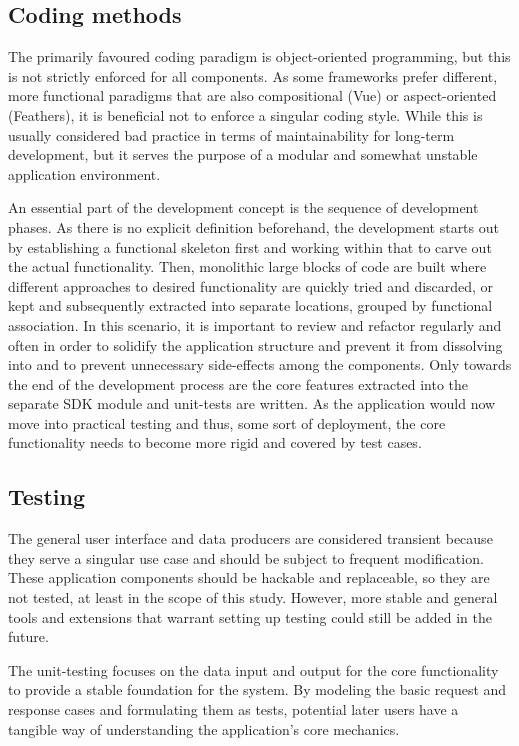 \subsection{Coding methods}

The primarily favoured coding paradigm is object-oriented programming, but this is not strictly enforced for all components.
As some frameworks prefer different, more functional paradigms that are also compositional (Vue) or aspect-oriented (Feathers), it is beneficial not to enforce a singular coding style.
While this is usually considered bad practice in terms of maintainability for long-term development, but it serves the purpose of a modular and somewhat unstable  application environment.

An essential part of the development concept is the sequence of development phases.
As there is no explicit definition beforehand, the development starts out by establishing a functional skeleton first and working within that to carve out the actual functionality.
Then, monolithic large blocks of code are built where different approaches to desired functionality are quickly tried and discarded, or kept and subsequently extracted into separate locations, grouped by functional association.
In this scenario, it is important to review and refactor regularly and often in order to solidify the application structure and prevent it from dissolving into  and to prevent unnecessary side-effects among the components.
Only towards the end of the development process are the core features extracted into the separate \ac{SDK} module and unit-tests are written.
As the application would now move into practical testing and thus, some sort of  deployment, the core functionality needs to become more rigid and covered by test cases.

\subsection{Testing}

The general user interface and data producers are considered transient because they serve a singular use case and should be subject to frequent modification.
These application components should be hackable and replaceable, so they are not tested, at least in the scope of this study.
However, more stable and general tools and extensions that warrant setting up testing could still be added in the future.

The unit-testing focuses on the data input and output for the core functionality to provide a stable foundation for the system.
By modeling the basic request and response cases and formulating them as tests, potential later users have a tangible way of understanding the application's core mechanics.

